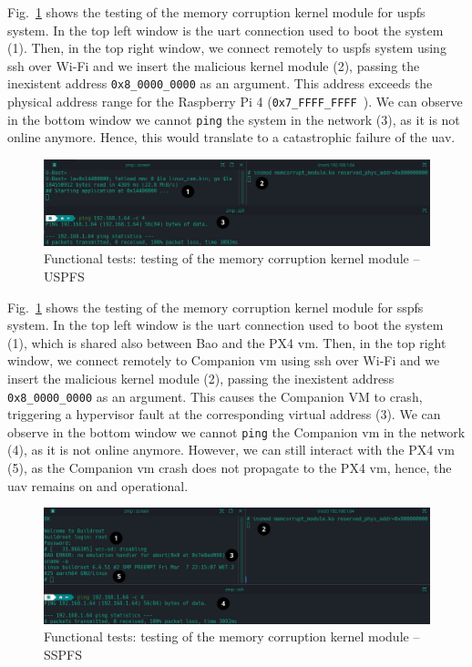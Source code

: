 Fig.~\ref{fig:kmod-memcorrupt-test} shows the testing of the memory corruption kernel
module for \gls{uspfs} system. In the top
left window is the \gls{uart} connection used to boot the system (1). Then, in
the top right window, we
connect remotely to \gls{uspfs} system using \gls{ssh} over Wi-Fi and we insert
the malicious kernel module (2), passing the inexistent address \lstinline{0x8_0000_0000}
as an argument. This address exceeds the physical address range for the
Raspberry Pi 4 (\lstinline{0x7_FFFF_FFFF}~\cite{rpi4-bcm2711}). We can observe in the bottom window we cannot
\lstinline{ping} the system in the network (3), as it is not online
anymore. Hence, this would translate to a catastrophic failure of the \gls{uav}.

\begin{figure}[!hbt]
  \centering
  \includegraphics[width=1.0\textwidth]{./img/png/kmod-memcorrupt-test-annot} 
  \caption{Functional tests: testing of the memory corruption kernel module -- USPFS}%
  \label{fig:kmod-memcorrupt-test}
\end{figure}

Fig.~\ref{fig:kmod-memcorrupt-test} shows the testing of the memory corruption kernel
module for \gls{sspfs} system. In the top
left window is the \gls{uart} connection used to boot the system (1), which is
shared also between Bao and the PX4 \gls{vm}. Then, in
the top right window, we connect remotely to Companion \gls{vm} using \gls{ssh} over Wi-Fi and we insert
the malicious kernel module (2), passing the inexistent address \lstinline{0x8_0000_0000}
as an argument. This causes the Companion VM to crash, triggering a hypervisor
fault at the corresponding virtual address (3). We can observe in the bottom window we cannot
\lstinline{ping} the Companion \gls{vm} in the network (4), as it is not online
anymore. However, we can still interact with the PX4 \gls{vm} (5), as the
Companion \gls{vm} crash does not propagate to the PX4 \gls{vm}, hence, the
\gls{uav} remains on and operational. 

\begin{figure}[!hbt]
  \centering
  \includegraphics[width=1.0\textwidth]{./img/png/kmod-memcorrupt-test-bao-annot} 
  \caption{Functional tests: testing of the memory corruption kernel module -- SSPFS}%
  \label{fig:kmod-memcorrupt-test-bao}
\end{figure}

